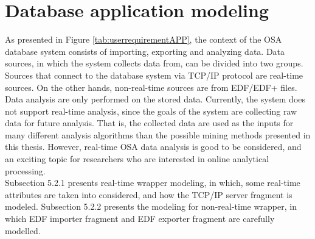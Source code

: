 \section{Database application modeling}
As presented in Figure \ref{tab:userrequirementAPP}, the context of the OSA database system consists of importing, exporting and analyzing data. Data sources, in which the system collects data from, can be divided into two groups. Sources that connect to the database system via TCP/IP protocol are real-time sources. On the other hands, non-real-time sources are from EDF/EDF+ files. Data analysis are only performed on the stored data. Currently, the system does not support real-time analysis, since the goals of the system are collecting raw data for future analysis. That is, the collected data are used as the inputs for many different analysis algorithms than the possible mining methods presented in this thesis. However, real-time OSA data analysis is good to be considered, and an exciting topic for researchers who are interested in online analytical processing.\\
Subsection 5.2.1 presents real-time wrapper modeling, in which, some real-time attributes are taken into considered, and how the TCP/IP server fragment is modeled. Subsection 5.2.2 presents the modeling for non-real-time wrapper, in which EDF importer fragment and EDF exporter fragment are carefully modelled.
